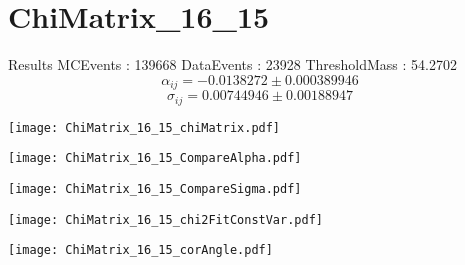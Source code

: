 \documentclass[a4paper,12pt]{article}
\begin{document}
\section{ChiMatrix\_16\_15}
\begin{minipage}{0.49\linewidth} Results \newline
MCEvents : 139668\newline
DataEvents : 23928 \newline
ThresholdMass : 54.2702\\
$$\alpha_{ij} = -0.0138272\pm 0.000389946$$
$$\sigma_{ij} = 0.00744946\pm 0.00188947$$
\end{minipage}\hfill
\begin{minipage}{0.49\linewidth} 
\texttt{[image: ChiMatrix\_16\_15\_chiMatrix.pdf]}\\
\end{minipage}
\hfill
\begin{minipage}{0.49\linewidth} 
\texttt{[image: ChiMatrix\_16\_15\_CompareAlpha.pdf]}\\
\end{minipage}
\hfill
\begin{minipage}{0.49\linewidth} 
\texttt{[image: ChiMatrix\_16\_15\_CompareSigma.pdf]}\\
\end{minipage}
\begin{minipage}{0.49\linewidth} 
\texttt{[image: ChiMatrix\_16\_15\_chi2FitConstVar.pdf]}\\
\end{minipage}
\hfill
\begin{minipage}{0.49\linewidth} 
\texttt{[image: ChiMatrix\_16\_15\_corAngle.pdf]}\\
\end{minipage}
\end{document}
